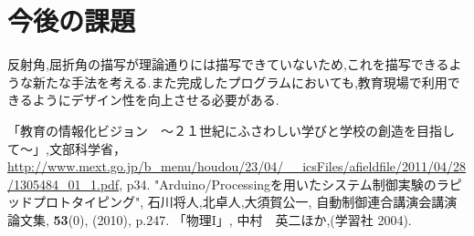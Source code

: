 \documentclass[a4j,twocolumn,uplatex]{jarticle}
\begin{document}
\section{今後の課題}
反射角,屈折角の描写が理論通りには描写できていないため,これを描写できるような新たな手法を考える.また完成したプログラムにおいても,教育現場で利用できるようにデザイン性を向上させる必要がある.
\vspace{-5mm}
\begin{thebibliography}{9}
「教育の情報化ビジョン　〜２１世紀にふさわしい学びと学校の創造を目指して〜」,文部科学省，\url{http://www.mext.go.jp/b_menu/houdou/23/04/__icsFiles/afieldfile/2011/04/28/1305484_01_1.pdf}, p34.
 "Arduino/Processingを用いたシステム制御実験のラピッドプロトタイピング", 石川将人,北卓人,大須賀公一, 自動制御連合講演会講演論文集, {\bf 53}(0), (2010), p.247.
 「物理I」, 中村　英二ほか,(学習社 2004).
\end{thebibliography}
\end{document}
